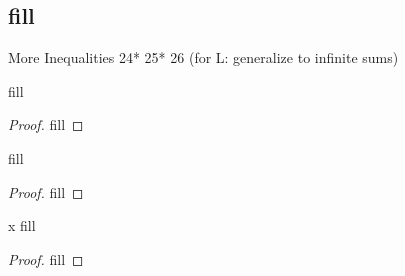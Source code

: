 \subsection{fill}

More Inequalities
24*
25*
26 (for L: generalize to infinite sums)


\begin{exercise}{24}
fill
\end{exercise}
\begin{proof}
fill
\end{proof} 

\begin{exercise}{25}
fill
\end{exercise}
\begin{proof}
fill
\end{proof} 

\begin{exercise}{x}
fill
\end{exercise}
\begin{proof}
fill
\end{proof} 
